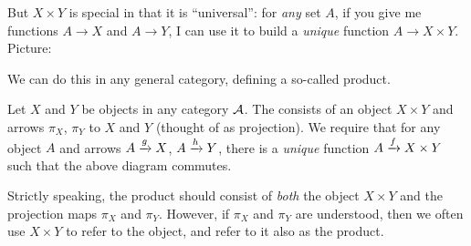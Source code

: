 But $X \times Y$ is special in that it is ``universal'':
for \emph{any} set $A$, if you give me functions $A \to X$ and $A \to Y$, I can use it
to build a \emph{unique} function $A \to X \times Y$.
Picture:
\begin{center}
\end{center}

We can do this in any general category, defining a so-called product.
\begin{definition}
	Let $X$ and $Y$ be objects in any category $\AA$.
	The  consists of an object $X \times Y$
	and arrows $\pi_X$, $\pi_Y$ to $X$ and $Y$ (thought of as projection).
	We require that for any object $A$ and arrows $A \taking g X$, $A \taking h Y$, there
	is a \emph{unique} function $A \taking f X \times Y$ such that the above diagram commutes.
\end{definition}
\begin{abuse}
	Strictly speaking, the product should consist of \emph{both}
	the object $X \times Y$
	and the projection maps $\pi_X$ and $\pi_Y$.
	However, if $\pi_X$ and $\pi_Y$ are understood,
	then we often use $X \times Y$ to refer to the object,
	and refer to it also as the product.
	\label{abuse:object}
\end{abuse}

